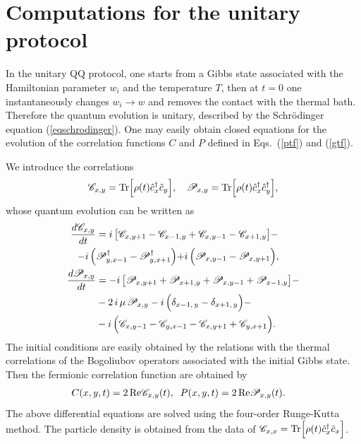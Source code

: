 \section{Computations for the unitary protocol}
\label{uniprotcomp}

In the unitary QQ protocol, one starts from a Gibbs state associated
with the Hamiltonian parameter $w_i$ and the temperature $T$, then at
$t=0$ one instantaneously changes $w_i\to w$ and removes the contact
with the thermal bath. Therefore the quantum evolution is unitary,
described by the Schr\"odinger equation (\ref{eqschrodinger}). One may
easily obtain closed equations for the evolution of the correlation
functions $C$ and $P$ defined in Eqs.~(\ref{ptf}) and (\ref{gtf}).

We introduce the correlations
\begin{eqnarray}
  \label{RedCorr}
  \mathscr{C}_{x,y} = {\rm Tr}\Bigr[\rho(t) \hat c^\dagger_x
    \hat c_y\Bigr],\quad
  \mathscr{P}_{x,y} = {\rm Tr}\Bigr[\rho(t) \hat c^\dagger_x
    \hat c^\dagger_y\Bigr],
\end{eqnarray}
whose quantum evolution can be written as
\begin{align}
\frac{d\mathscr{C}_{x,y}}{dt}& =
i\,\bigr[\mathscr{C}_{x,y+1} - \mathscr{C}_{x-1,y} +
\mathscr{C}_{x,y-1} - \mathscr{C}_{x+1,y} \bigr] - \notag\\
-i\, \Bigl(& \mathscr{P}_{y,x-1}^\dagger -
\mathscr{P}_{y,x+1}^\dagger \Bigl)  + i\, \Bigl(
\mathscr{P}_{x,y-1} - \mathscr{P}_{x,y+1} \Bigl), \\
\frac{d\mathscr{P}_{x,y}}{dt} &=
-i\,\bigr[\mathscr{P}_{x,y+1} + \mathscr{P}_{x+1,y}+
\mathscr{P}_{x,y-1} + \mathscr{P}_{x-1,y} \bigr] - \notag\\
&- 2\,i\,\mu  \,\mathscr{P}_{x,y}-i\,\Bigl(
\delta _{x-1,\,y} - \delta _{x+1,\,y} \Bigl) - \notag \\
 &- i\, \Bigl( \mathscr{C}_{x,y-1} -
\mathscr{C}_{y,x-1} - \mathscr{C}_{x,y+1}
+ \mathscr{C}_{y,x+1} \Bigl).
\end{align}
The initial conditions are easily obtained by the relations with the
thermal correlations of the Bogoliubov operators associated with the
initial Gibbs state. Then the fermionic correlation function are
obtained by
\begin{eqnarray}
C(x,y,t) = 2\,{\rm Re}{\mathscr{C}_{x,y}}(t),\;\;
P(x,y,t) = 2\,{\rm Re}{\mathscr{P}_{x,y}}(t).\quad
\label{cpcpmp}
\end{eqnarray}
The above differential equations are solved using the four-order
Runge-Kutta method. The particle density is obtained from the data of
$\mathscr{C}_{x,x} = {\rm Tr}\Bigr[\rho(t) \hat c^\dagger_x \hat
  c_x\Bigr]$.



